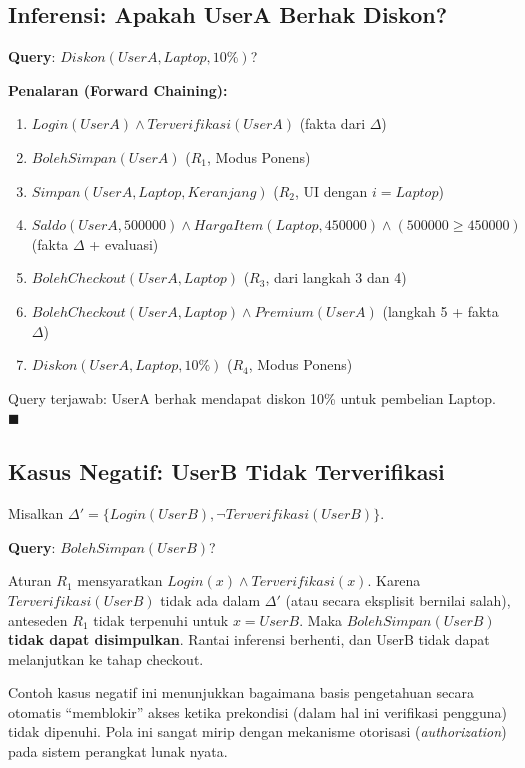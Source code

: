 \subsection{Inferensi: Apakah UserA Berhak Diskon?}

\begin{contoh}
\textbf{Query}: $Diskon(UserA, Laptop, 10\%)$?

\textbf{Penalaran (Forward Chaining):}
\begin{enumerate}
    \item $Login(UserA) \wedge Terverifikasi(UserA)$ \hfill (fakta dari $\Delta$)
    \item $BolehSimpan(UserA)$ \hfill ($R_1$, Modus Ponens)
    \item $Simpan(UserA, Laptop, Keranjang)$ \hfill ($R_2$, UI dengan $i = Laptop$)
    \item $Saldo(UserA, 500000) \wedge HargaItem(Laptop, 450000) \wedge (500000 \geq 450000)$
    \hfill (fakta $\Delta$ + evaluasi)
    \item $BolehCheckout(UserA, Laptop)$ \hfill ($R_3$, dari langkah 3 dan 4)
    \item $BolehCheckout(UserA, Laptop) \wedge Premium(UserA)$ \hfill (langkah 5 + fakta $\Delta$)
    \item $Diskon(UserA, Laptop, 10\%)$ \hfill ($R_4$, Modus Ponens)
\end{enumerate}

Query terjawab: UserA berhak mendapat diskon 10\% untuk pembelian Laptop. $\blacksquare$
\end{contoh}

\subsection{Kasus Negatif: UserB Tidak Terverifikasi}

\begin{contoh}
Misalkan $\Delta' = \{Login(UserB), \neg Terverifikasi(UserB)\}$.

\textbf{Query}: $BolehSimpan(UserB)$?

Aturan $R_1$ mensyaratkan $Login(x) \wedge Terverifikasi(x)$. Karena $Terverifikasi(UserB)$ tidak ada dalam $\Delta'$ (atau secara eksplisit bernilai salah), anteseden $R_1$ tidak terpenuhi untuk $x = UserB$. Maka $BolehSimpan(UserB)$ \textbf{tidak dapat disimpulkan}. Rantai inferensi berhenti, dan UserB tidak dapat melanjutkan ke tahap checkout.
\end{contoh}

\begin{catatan}
Contoh kasus negatif ini menunjukkan bagaimana basis pengetahuan secara otomatis ``memblokir'' akses ketika prekondisi (dalam hal ini verifikasi pengguna) tidak dipenuhi. Pola ini sangat mirip dengan mekanisme otorisasi (\textit{authorization}) pada sistem perangkat lunak nyata.
\end{catatan}
